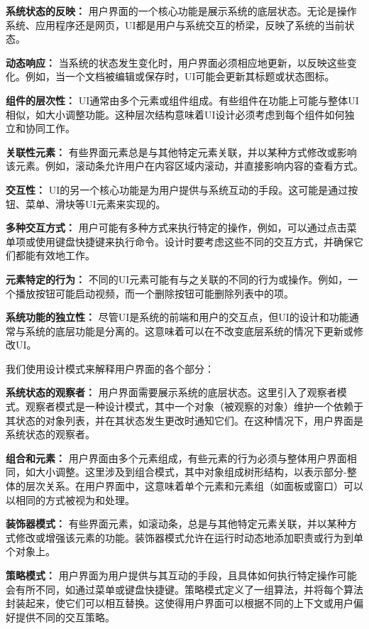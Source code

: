\textbf{系统状态的反映：}
用户界面的一个核心功能是展示系统的底层状态。无论是操作系统、应用程序还是网页，UI都是用户与系统交互的桥梁，反映了系统的当前状态。

\textbf{动态响应：}
当系统的状态发生变化时，用户界面必须相应地更新，以反映这些变化。例如，当一个文档被编辑或保存时，UI可能会更新其标题或状态图标。

\textbf{组件的层次性：}
UI通常由多个元素或组件组成。有些组件在功能上可能与整体UI相似，如大小调整功能。这种层次结构意味着UI设计必须考虑到每个组件如何独立和协同工作。

\textbf{关联性元素：}
有些界面元素总是与其他特定元素关联，并以某种方式修改或影响该元素。例如，滚动条允许用户在内容区域内滚动，并直接影响内容的查看方式。

\textbf{交互性：}
UI的另一个核心功能是为用户提供与系统互动的手段。这可能是通过按钮、菜单、滑块等UI元素来实现的。

\textbf{多种交互方式：}
用户可能有多种方式来执行特定的操作，例如，可以通过点击菜单项或使用键盘快捷键来执行命令。设计时要考虑这些不同的交互方式，并确保它们都能有效地工作。

\textbf{元素特定的行为：}
不同的UI元素可能有与之关联的不同的行为或操作。例如，一个播放按钮可能启动视频，而一个删除按钮可能删除列表中的项。

\textbf{系统功能的独立性：}
尽管UI是系统的前端和用户的交互点，但UI的设计和功能通常与系统的底层功能是分离的。这意味着可以在不改变底层系统的情况下更新或修改UI。

我们使用设计模式来解释用户界面的各个部分：

\textbf{系统状态的观察者：}
用户界面需要展示系统的底层状态。这里引入了观察者模式。观察者模式是一种设计模式，其中一个对象（被观察的对象）维护一个依赖于其状态的对象列表，并在其状态发生更改时通知它们。在这种情况下，用户界面是系统状态的观察者。

\textbf{组合和元素：}
用户界面由多个元素组成，有些元素的行为必须与整体用户界面相同，如大小调整。这里涉及到组合模式，其中对象组成树形结构，以表示部分-整体的层次关系。在用户界面中，这意味着单个元素和元素组（如面板或窗口）可以以相同的方式被视为和处理。

\textbf{装饰器模式：}
有些界面元素，如滚动条，总是与其他特定元素关联，并以某种方式修改或增强该元素的功能。装饰器模式允许在运行时动态地添加职责或行为到单个对象上。

\textbf{策略模式：}
用户界面为用户提供与其互动的手段，且具体如何执行特定操作可能会有所不同，如通过菜单或键盘快捷键。策略模式定义了一组算法，并将每个算法封装起来，使它们可以相互替换。这使得用户界面可以根据不同的上下文或用户偏好提供不同的交互策略。

